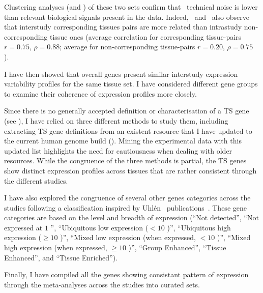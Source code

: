 Clustering analyses (and \Welchttest) of these two sets
confirm that \Rnaseq\ technical noise is
lower than relevant biological signals present in the data.
Indeed,~\cite{Sudmant2015-zt,Danielsson2015-cn,Yu2015-uh} and~\cite{Uhlen:2016}
also observe that interstudy corresponding tissues pairs are more related than
intrastudy non-corresponding tissue ones
(average correlation for corresponding tissue-pairs $r=0.75$, $\rho=0.88$;
average for non-corresponding tissue-pairs $r=0.20$, $\rho=0.75$).\mybr\

I have then showed that overall genes present
similar interstudy expression variability profiles for the same tissue set.
I have considered different gene groups
to examine their coherence of expression profiles more closely.

Since there is no generally accepted definition or characterisation
of a \gls{TS} gene (see ),
I have relied on three different methods to study them,
including extracting \gls{TS} gene definitions
from an existent resource
that I have updated to the current human genome build ().
Mining the experimental data with this updated list highlights
the need for cautiousness when dealing with older resources.
While the congruence of the three methods is partial,
the \gls{TS} genes show distinct expression profiles across tissues
that are rather consistent through the different studies.\mybr\

I have also explored the congruence of several other genes categories
across the studies following a classification
inspired by Uhlén \etal\ publications~.
These gene categories are based on the level and breadth of expression
(\enquote{Not detected}, \enquote{Not expressed at $1$ \FPKM},
\enquote{Ubiquitous low expression ($< 10$ \FPKM)},
\enquote{Ubiquitous high expression ($≥ 10$ \FPKM)},
\enquote{Mixed low expression (when expressed, $< 10$ \FPKM)},
\enquote{Mixed high expression (when expressed, $≥ 10$ \FPKM)},
\enquote{Group Enhanced},
\enquote{Tissue Enhanced},
and \enquote{Tissue Enriched}).

Finally, I have compiled all the genes showing consistant pattern of expression
through the meta-analyses across the studies into curated sets.\mybr\

